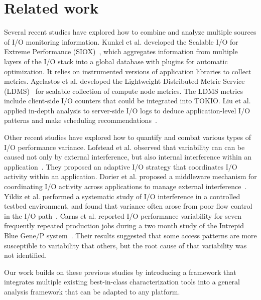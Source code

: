 \section{Related work} \label{sec:related}

Several recent studies have explored how to combine
and analyze multiple sources of I/O monitoring information.
Kunkel et al. developed the Scalable I/O for Extreme Performance
(SIOX)~\cite{Kunkel:2014:SAC:2769884.2769901}, which aggregates
information from multiple layers of the I/O stack into a global database
with plugins for automatic optimization.  It relies on instrumented
versions of application libraries to collect metrics.  Agelastos et al.
developed the Lightweight Distributed Metric Service (LDMS)~\cite{7013000}
for scalable collection of compute node metrics. The LDMS metrics include
client-side I/O counters that could be integrated into TOKIO.  Liu et al. applied in-depth
analysis to server-side I/O logs to deduce application-level I/O patterns
and make scheduling recommendations~\cite{Liu2016}.

Other recent studies have explored how to quantify and combat various
types of I/O performance variance.  Lofstead et al. observed that
variability can can be caused not only by external interference, but also
internal interference within an application~\cite{lofstead2010managing}.
They proposed an adaptive I/O strategy that coordinates I/O activity
within an application.  Dorier et al. proposed a middleware mechanism
for coordinating I/O activity across applications to manage external
interference~\cite{dorier2014calciom}.  Yildiz et al. performed a
systematic study of I/O interference in a controlled testbed environment,
and found that variance often arose from poor flow control in the I/O
path~\cite{Yildiz2016}.  Carns et al. reported I/O performance variability
for seven frequently repeated production jobs during a two month study
of the Intrepid Blue Gene/P system~\cite{carns2011understanding}.
Their results suggested that some access patterns are more susceptible
to variability that others, but the root cause of that variability was
not identified.

Our work builds on these previous studies by introducing a framework that
integrates multiple existing best-in-class characterization tools into a
general analysis framework that can be adapted to any platform.



